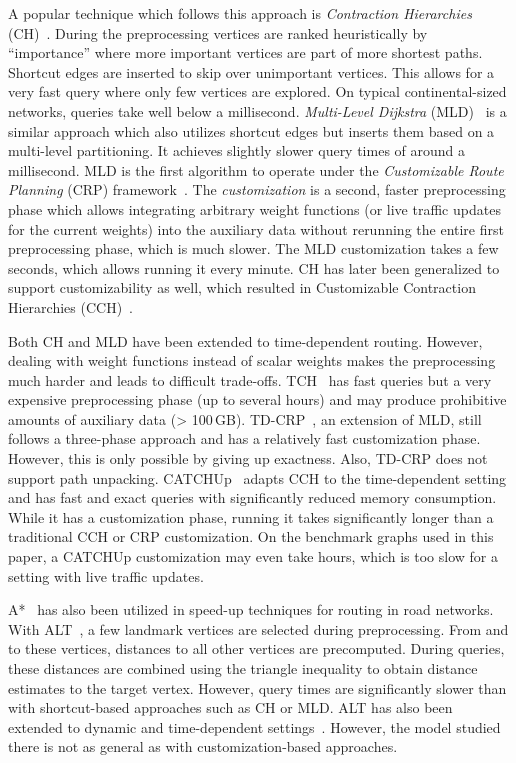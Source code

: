 \documentclass[a4paper,UKenglish,cleveref, autoref, thm-restate,anonymous]{lipics-v2021}
\begin{document}
A popular technique which follows this approach is \emph{Contraction Hierarchies} (CH)~\cite{gssv-erlrn-12}.
During the preprocessing vertices are ranked heuristically by ``importance'' where more important vertices are part of more shortest paths.
Shortcut edges are inserted to skip over unimportant vertices.
This allows for a very fast query where only few vertices are explored.
On typical continental-sized networks, queries take well below a millisecond.
\emph{Multi-Level Dijkstra} (MLD)~\cite{swz-umlgt-02} is a similar approach which also utilizes shortcut edges but inserts them based on a multi-level partitioning.
It achieves slightly slower query times of around a millisecond.
MLD is the first algorithm to operate under the \emph{Customizable Route Planning} (CRP) framework~\cite{dgpw-crprn-13}.
The \emph{customization} is a second, faster preprocessing phase which allows integrating arbitrary weight functions (or live traffic updates for the current weights) into the auxiliary data without rerunning the entire first preprocessing phase, which is much slower.
The MLD customization takes a few seconds, which allows running it every minute.
CH has later been generalized to support customizability as well, which resulted in Customizable Contraction Hierarchies (CCH)~\cite{dsw-cch-15}.

Both CH and MLD have been extended to time-dependent routing.
However, dealing with weight functions instead of scalar weights makes the preprocessing much harder and leads to difficult trade-offs.
TCH~\cite{bgsv-mtdtt-13} has fast queries but a very expensive preprocessing phase (up to several hours) and may produce prohibitive amounts of auxiliary data (> 100\,GB).
TD-CRP~\cite{bdpw-dtdrp-16}, an extension of MLD, still follows a three-phase approach and has a relatively fast customization phase.
However, this is only possible by giving up exactness.
Also, TD-CRP does not support path unpacking.
CATCHUp~\cite{swz-sfert-21} adapts CCH to the time-dependent setting and has fast and exact queries with significantly reduced memory consumption.
While it has a customization phase, running it takes significantly longer than a traditional CCH or CRP customization.
On the benchmark graphs used in this paper, a CATCHUp customization may even take hours, which is too slow for a setting with live traffic updates.

A*~\cite{hnr-afbhd-68} has also been utilized in speed-up techniques for routing in road networks.
With ALT~\cite{gh-cspas-05,gw-cppsp-05}, a few landmark vertices are selected during preprocessing.
From and to these vertices, distances to all other vertices are precomputed.
During queries, these distances are combined using the triangle inequality to obtain distance estimates to the target vertex.
However, query times are significantly slower than with shortcut-based approaches such as CH or MLD.
ALT has also been extended to dynamic and time-dependent settings~\cite{dn-crdtd-12}. %
However, the model studied there is not as general as with customization-based approaches.
\end{document}
